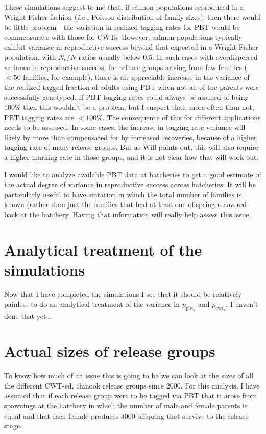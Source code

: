 \documentclass[11pt]{article}
\newcommand{\ie}{{\em i.e.},\xspace }
\begin{document}
These simulations suggest to me that, if salmon populations reproduced in a Wright-Fisher fashion
(\ie Poisson distribution of family sizes), then there would be little problem---the variation in
realized tagging rates for PBT would be commensurate with those for CWTs.  However, salmon populations
typically exhibit variance in reproductive success beyond that expected in a Wright-Fisher population, with
$N_e/N$ ratios usually below 0.5.  In such cases with overdispersed variance in reproductive success,
for release groups arising from few families ($<50$ families, for example),
there is an appreciable increase in the variance of the realized tagged fraction of adults using PBT when
not all of the parents were successfully genotyped.  If PBT tagging rates could always be assured of being
100\% then this wouldn't be a problem, but I suspect that, more often than not,
PBT tagging rates are $<100\%$.  The
consequence of this for different applications needs to be assessed.   In some cases, the increase in tagging
rate variance will likely by more than compensated for by increased recoveries, because of a higher tagging
rate of many release groups.  But as Will points out, this will also require a higher marking rate in those
groups, and it is not clear how that will work out.

I would like to analyze available PBT data at hatcheries to get a good estimate of the actual degree
of variance in reproductive success across hatcheries.  It will be particularly useful to have siutation in which
the total number of families is known (rather than just the families that had at least one offspring
recovered back at the hatchery.  Having that information will really help assess
this issue.

\section{Analytical treatment of the simulations}
Now that I have completed the simulations I see that it should be relatively painless to do an analytical treatment of the variance in 
$p_\mathrm{pbt_a}$ and $p_\mathrm{cwt_a}$.  I haven't done that yet\ldots 

\section{Actual sizes of release groups}
To know how much of an issue this is going to be we can look at the sizes of all the different
CWT-ed, chinook release groups since 2000.  For this analysis, I have assumed that if each release group
were to be tagged via PBT that it arose from spawnings at the hatchery in which the number of male
and female parents is equal and that each female produces 3000 offspring that survive to the release stage.
\end{document}

